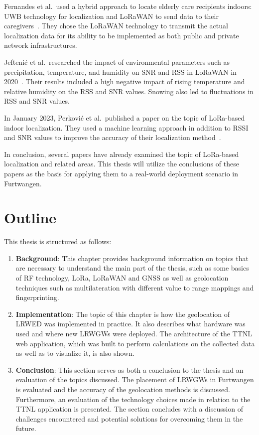 Fernandes et al.\ used a hybrid approach to locate elderly care recipients indoors: \ac{UWB} technology for localization and \ac{LoRaWAN} to send data to their caregivers~\cite{fernandes_hybrid_2020}.
They chose the \ac{LoRaWAN} technology to transmit the actual localization data for its ability to be implemented as both public and private network infrastructures.

Jeftenić et al.\ researched the impact of environmental parameters such as precipitation, temperature, and humidity on \ac{SNR} and \ac{RSS} in \ac{LoRaWAN} in 2020~\cite{jeftenic_impact_2020}.
Their results included a high negative impact of rising temperature and relative humidity on the \ac{RSS} and \ac{SNR} values.
Snowing also led to fluctuations in \ac{RSS} and \ac{SNR} values.

In January 2023, Perković et al.\ published a paper on the topic of \ac{LoRa}-based indoor localization.
They used a machine learning approach in addition to \ac{RSSI} and \ac{SNR} values to improve the accuracy of their localization method~\cite{perkovic_machine_2023}.

In conclusion, several papers have already examined the topic of \ac{LoRa}-based localization and related areas.
This thesis will utilize the conclusions of these papers as the basis for applying them to a real-world deployment scenario in Furtwangen.

\section{Outline}

This thesis is structured as follows:

\begin{enumerate}
      \item \textbf{Background}:
            This chapter provides background information on topics that are necessary to understand the main part of the thesis, such as some basics of \ac{RF} technology, \ac{LoRa}, \ac{LoRaWAN} and \ac{GNSS} as well as geolocation techniques such as multilateration with different value to range mappings and fingerprinting.
      \item \textbf{Implementation}:
            The topic of this chapter is how the geolocation of \acl{LRWED} was implemented in practice.
            It also describes what hardware was used and where new \aclp{LRWGW} were deployed.
            The architecture of the \ac{TTNL} web application, which was built to perform calculations on the collected data as well as to visualize it, is also shown.
      \item \textbf{Conclusion}:
            This section serves as both a conclusion to the thesis and an evaluation of the topics discussed.
            The placement of \aclp{LRWGW} in Furtwangen is evaluated and the accuracy of the geolocation methods is discussed.
            Furthermore, an evaluation of the technology choices made in relation to the \ac{TTNL} application is presented.
            The section concludes with a discussion of challenges encountered and potential solutions for overcoming them in the future.
\end{enumerate}

